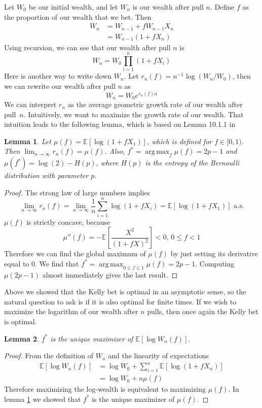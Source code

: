 \documentclass[letterpaper]{article}
\DeclareMathOperator*{\argmax}{arg\,max}
\numberwithin{equation}{section}
\theoremstyle{plain}
\newtheorem{lemma}{Lemma}[section]
\begin{document}
Let $W_0$ be our initial wealth, and let $W_n$ is our wealth after pull $n$. Define $f$ as the proportion of our wealth that we bet. Then
\begin{align}
W_n &= W_{n-1} +fW_{n-1} X_n\\
&= W_{n-1} (1+fX_n)
\end{align}
Using recursion, we can see that our wealth after pull $n$ is
\begin{equation}
W_n = W_0 \prod_{i=1}^n (1+f X_i)
\end{equation}
Here is another way to write down $W_n$. Let $r_n(f) = n^{-1} \log (W_n / W_0)$, then we can rewrite our wealth after pull $n$ as
\begin{equation}
W_n = W_0 e^{r_n(f) n}
\end{equation}
We can interpret $r_n$ as the average geometric growth rate of our wealth after pull~$n$. Intuitively, we want to maximize the growth rate of our wealth. That intuition leads to the following lemma, which is based on Lemma 10.1.1 in \cite{ethier2010doctrine}
\begin{lemma}\label{lemma:kelly_asymp_growth}
Let $\mu(f) = \mathbb{E}[\log(1+fX_1)]$, which is defined for $f\in[0, 1)$. Then $\lim_{n\to\infty} r_n(f) = \mu(f)$. Also, $f^* = \argmax_f \mu(f) = 2p-1$ and $\mu(f^*) = \log(2) - H(p)$, where $H(p)$ is the entropy of the Bernoulli distribution with parameter $p$.
\end{lemma}
\begin{proof}
The strong law of large numbers implies
\begin{equation}
\lim_{n\to\infty}  r_n(f) = \lim_{n\to\infty} \frac{1}{n} \sum_{i=1}^n \log(1+f X_i) = \mathbb{E}[\log(1+fX_1)] \text{ a.s.}
\end{equation}
$\mu(f)$ is strictly concave, because
\begin{equation}
\mu''(f) = -\mathbb{E}\left[\frac{X^2}{(1+fX)^2}\right] < 0,\, 0 \le f < 1
\end{equation}
Therefore we can find the global maximum of $\mu(f)$ by just setting its derivative equal to 0. We find that $f^* = \argmax_{0\le f\le 1}\mu(f) = 2p-1$. Computing $\mu(2p-1)$ almost immediately gives the last result.
\end{proof}
Above we showed that the Kelly bet is optimal in an asymptotic sense, so the natural question to ask is if it is also optimal for finite times. If we wish to maximize the logarithm of our wealth after $n$ pulls, then once again the Kelly bet is optimal.
\begin{lemma}
$f^*$ is the unique maximizer of $\mathbb{E}[\log W_n(f)]$.
\end{lemma}
\begin{proof}
From the definition of $W_n$ and the linearity of expectations
\begin{align}
\mathbb{E}[\log W_n(f)] &= \log W_0 + \sum_{i=1}^n \mathbb{E}[\log (1+f X_n)]\\
&= \log W_0 + n \mu(f)
\end{align}
Therefore maximizing the log-wealth is equivalent to maximizing $\mu(f)$. In lemma \ref{lemma:kelly_asymp_growth} we showed that $f^*$ is the unique maximizer of $\mu(f)$.
\end{proof}
\end{document}
